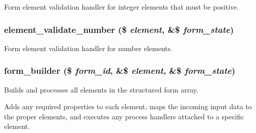 \label{group__form__api_gad8feb4fd6d8404783042cde1146f53cf}
Form element validation handler for integer elements that must be positive. \hypertarget{group__form__api_ga64f40a7bf432284ba5b15021445abd86}{
\subsubsection[{element\_\-validate\_\-number}]{\setlength{\rightskip}{0pt plus 5cm}element\_\-validate\_\-number (\$ {\em element}, \/  \&\$ {\em form\_\-state})}}
\label{group__form__api_ga64f40a7bf432284ba5b15021445abd86}
Form element validation handler for number elements. \hypertarget{group__form__api_gae839323ba1c81ba86030b496fee24f7d}{
\subsubsection[{form\_\-builder}]{\setlength{\rightskip}{0pt plus 5cm}form\_\-builder (\$ {\em form\_\-id}, \/  \&\$ {\em element}, \/  \&\$ {\em form\_\-state})}}
\label{group__form__api_gae839323ba1c81ba86030b496fee24f7d}
Builds and processes all elements in the structured form array.

Adds any required properties to each element, maps the incoming input data to the proper elements, and executes any process handlers attached to a specific element.

